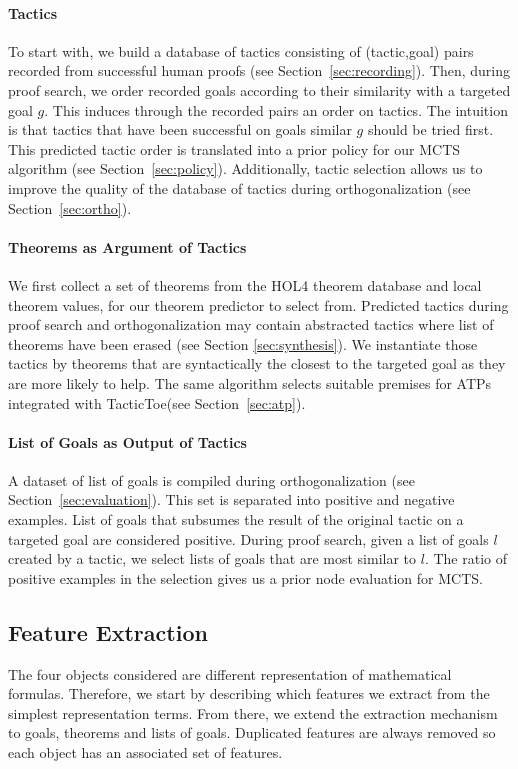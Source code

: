 \documentclass[runningheads,a4paper,draft]{svjour3}
\def\holfour{\textsf{HOL4}\xspace}
\def\tactictoe{\textsf{TacticToe}\xspace}
\begin{document}
\paragraph{Tactics}
To start with, we build a database of tactics consisting
of (tactic,goal) pairs recorded from successful human proofs (see 
Section~\ref{sec:recording}).
Then, during proof search, we order recorded goals according to their 
similarity with a targeted goal $g$. This induces through the recorded pairs an 
order on tactics. The intuition is that tactics that have been successful on 
goals similar $g$ should be tried first. 
This predicted tactic order is translated into a prior policy for our MCTS 
algorithm (see Section~\ref{sec:policy}).
Additionally, tactic selection allows us to improve the quality of the database 
of tactics during orthogonalization (see Section~\ref{sec:ortho}).


\paragraph{Theorems as Argument of Tactics}
We first collect a set of theorems from the \holfour theorem database and local 
theorem values, for our theorem predictor to select from.
Predicted tactics during proof search and orthogonalization may contain 
abstracted tactics where list of theorems have been erased (see Section 
\ref{sec:synthesis}).
We instantiate those tactics by theorems that are syntactically the closest to 
the targeted goal as they are more likely to help.
The same algorithm selects suitable premises for ATPs integrated with  
\tactictoe (see Section~\ref{sec:atp}).

\paragraph{List of Goals as Output of Tactics}
A dataset of list of goals is compiled during orthogonalization (see 
Section~\ref{sec:evaluation}).
This set is separated into positive and negative examples.
List of goals that subsumes the result of the original tactic on a 
targeted goal are considered positive. During proof search, given a list of 
goals $l$ created by a tactic, we select lists of goals that are most similar 
to $l$.
The ratio of positive examples in the selection gives us a prior node 
evaluation for MCTS.


\subsection{Feature Extraction}\label{sec:features}
The four objects considered are different representation of mathematical 
formulas. Therefore, we start by describing which features we extract from the 
simplest representation terms. From there, we extend the extraction mechanism 
to goals, theorems and lists of goals. Duplicated features are always removed 
so each object has an associated set of features.
\end{document}
